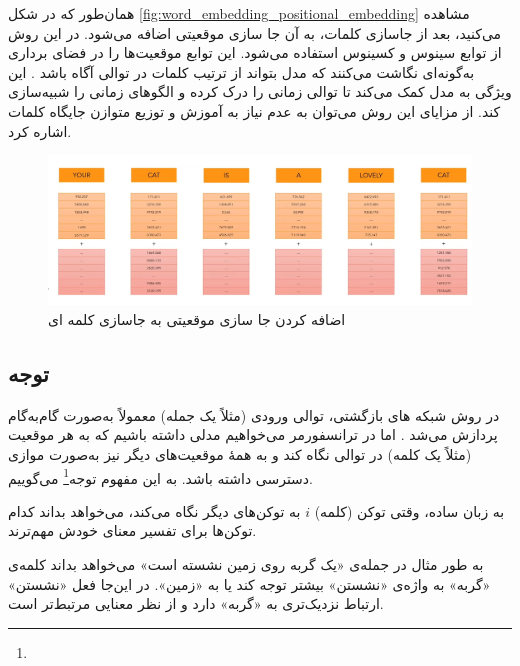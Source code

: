 همان‌طور که در شکل \autoref{fig:word_embedding_positional_embedding} مشاهده می‌کنید، بعد از جاسازی کلمات، به آن جا سازی موقعیتی اضافه می‌شود. در این روش از توابع سینوس و کسینوس استفاده می‌شود. این توابع موقعیت‌ها را در فضای برداری به‌گونه‌ای نگاشت می‌کنند که مدل بتواند از ترتیب کلمات در توالی آگاه باشد \cite{vaswani2017attention}. این ویژگی به مدل کمک می‌کند تا توالی زمانی را درک کرده و الگوهای زمانی را شبیه‌سازی کند. از مزایای این روش می‌توان به عدم نیاز به آموزش و توزیع متوازن جایگاه کلمات اشاره کرد.

\begin{figure}[h]
	\centering
	\begin{minipage}[b]{0.7\textwidth}
		\centering
		\includegraphics[width=\textwidth]{transformer_images/positional_embedding.png}
		\caption{اضافه کردن جا سازی موقعیتی به جاسازی کلمه ای}
		\label{fig:word_embedding_positional_embedding}
	\end{minipage}
	\hfill
\end{figure}


\subsection{توجه}



در روش‌ شبکه های بازگشتی، توالی ورودی (مثلاً یک جمله) معمولاً به‌صورت گام‌به‌گام پردازش می‌شد \cite{elman1990finding,hochreiter1997long}. اما در ترانسفورمر می‌خواهیم مدلی داشته باشیم که به هر موقعیت (مثلاً یک کلمه) در توالی نگاه کند و به همهٔ موقعیت‌های دیگر نیز به‌صورت موازی دسترسی داشته باشد. به این مفهوم توجه\footnote{} می‌گوییم.

به زبان ساده، وقتی توکن (کلمه) \( i \) به توکن‌های دیگر نگاه می‌کند، می‌خواهد بداند کدام توکن‌ها برای تفسیر معنای خودش مهم‌ترند.

به طور مثال در جمله‌ی «یک گربه روی زمین نشسته است» می‌خواهد بداند کلمه‌ی «گربه» به واژه‌ی «نشستن» بیشتر توجه کند یا به «زمین». در این‌جا فعل «نشستن» ارتباط نزدیک‌تری به «گربه» دارد و از نظر معنایی مرتبط‌تر است.


